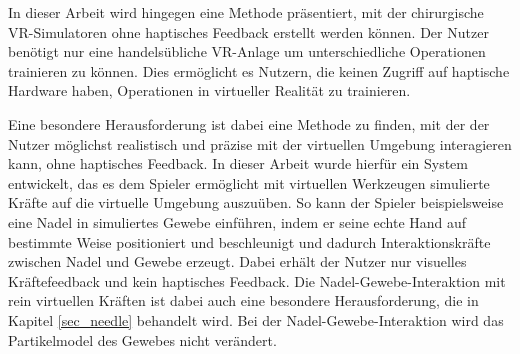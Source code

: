 In dieser Arbeit wird hingegen eine Methode präsentiert, mit der chirurgische VR-Simulatoren ohne haptisches Feedback erstellt werden können. Der Nutzer benötigt nur eine handelsübliche VR-Anlage 
um unterschiedliche Operationen trainieren zu können. 
Dies ermöglicht es Nutzern, die keinen Zugriff auf haptische Hardware haben, Operationen in virtueller Realität zu trainieren. 

Eine besondere Herausforderung ist dabei eine Methode zu finden, mit der der Nutzer möglichst realistisch und präzise mit der virtuellen Umgebung interagieren kann, ohne haptisches Feedback. In dieser Arbeit wurde hierfür ein System entwickelt, das es dem Spieler ermöglicht mit virtuellen Werkzeugen simulierte Kräfte auf die virtuelle Umgebung auszuüben. So kann der Spieler beispielsweise eine Nadel in simuliertes Gewebe einführen, indem er seine echte Hand auf bestimmte Weise positioniert und beschleunigt und dadurch Interaktionskräfte zwischen Nadel und Gewebe erzeugt. 
Dabei erhält der Nutzer nur visuelles Kräftefeedback und kein haptisches Feedback.
Die Nadel-Gewebe-Interaktion mit rein virtuellen Kräften ist dabei auch eine besondere Herausforderung, die in Kapitel \ref{sec_needle} behandelt wird. 
Bei der Nadel-Gewebe-Interaktion wird das Partikelmodel des Gewebes nicht verändert. 








